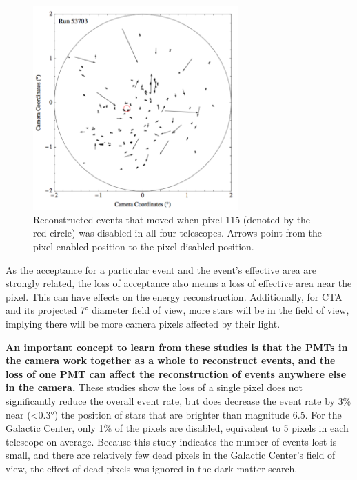 \begin{figure}[!ht]
  \centering
  \includegraphics[width=0.7\textwidth]{images/disabled_pixel/moving_events}
  \caption[Event Movement After Disabling Camera Pixels]{
    Reconstructed events that moved when pixel 115 (denoted by the red circle) was disabled in all four telescopes.  
    Arrows point from the pixel-enabled position to the pixel-disabled position.
  }
  \label{fig:dpix_move}
\end{figure}

As the acceptance for a particular event and the event's effective area are strongly related, the loss of acceptance also means a loss of effective area near the pixel.
This can have effects on the energy reconstruction.
Additionally, for CTA and its projected \ang{7} diameter field of view, more stars will be in the field of view, implying there will be more camera pixels affected by their light.

\textbf{An important concept to learn from these studies is that the PMTs in the camera work together as a whole to reconstruct events, and the loss of one PMT can affect the reconstruction of events anywhere else in the camera.}
These studies show the loss of a single pixel does not significantly reduce the overall event rate, but does decrease the event rate by \nicetilde{}3\% near (<\ang{0.3}) the position of stars that are brighter than magnitude 6.5.
For the Galactic Center, only 1\% of the pixels are disabled, equivalent to 5 pixels in each telescope on average.
Because this study indicates the number of events lost is small, and there are relatively few dead pixels in the Galactic Center's field of view, the effect of dead pixels was ignored in the dark matter search.

